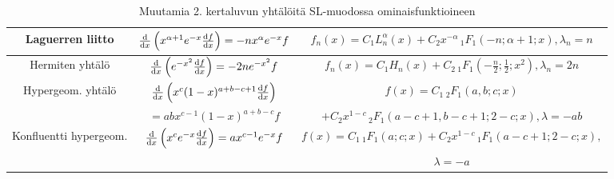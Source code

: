 \documentclass[../johdoksia.tex]{subfiles}
\begin{document}
\begin{table}[h!]
\begin{tabular}{|c|c|c|}
			Laguerren liitto & $\odv{}{x}\left(x^{\alpha + 1}e^{-x}\odv{f}{x}\right) = -nx^\alpha e^{-x}f$ & $f_n(x) = C_1L_{n}^{\alpha}(x) + C_2x^{-\alpha} \, {_{1}F_1}(-n; \alpha + 1; x), \lambda_n = n$ \\
			\hline
			Hermiten yhtälö & $\odv{}{x}\left(e^{-x^2}\odv{f}{x}\right) = -2ne^{-x^2}f$ & $f_n(x) = C_1H_n(x) + C_{2} \, {_{1}F_{1}}\left(-\frac{n}{2}; \frac{1}{2}; x^2\right), \lambda_n = 2n$ \\
			\hline
			Hypergeom. yhtälö & $\odv{}{x}\left(x^c(1 - x)^{a + b - c + 1}\odv{f}{x}\right)$ & $f(x) = C_1 \, {_{2}F_1}(a, b; c; x)$ \\
			& $= abx^{c - 1}(1 - x)^{a + b - c}f$ & $ + C_2x^{1 - c}\,{_{2}F_1}(a - c + 1, b - c + 1; 2 - c; x), \lambda = -ab$ \\
			\hline
			Konfluentti hypergeom. & $\odv{}{x}\left(x^ce^{-x}\odv{f}{x}\right) = ax^{c-1}e^{-x}f$ & $f(x) = C_1 \, {_{1}F_1}(a; c; x) + C_2 x^{1-c}\,{_{1}F_1}(a - c + 1; 2 - c; x),$ \\
			& & $\lambda = -a$ \\
			\hline
		\end{tabular}
		\caption{Muutamia 2. kertaluvun yhtälöitä SL-muodossa ominaisfunktioineen}
	\end{table}
	
	\begin{comment}
		Lin. vak.kerr. & $\odv{}{x}\left(e^{bx}\odv{f}{x}\right) = -\lambda f$ & $f_k(x) = C_1e^{\frac{x}{2}\left(-b + \sqrt{b^2 - 4\lambda_k}\right)} + C_2e^{-\frac{x}{2}\left(b + \sqrt{b^2 - 4\lambda_k}\right)}, \lambda_k = \omega_k$ \\
	\end{comment}
\end{document}
